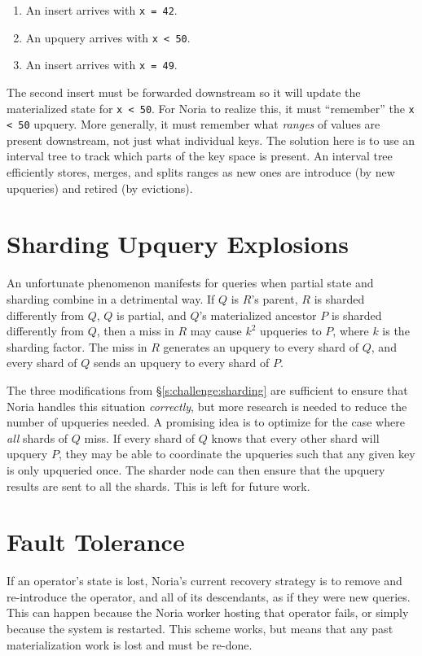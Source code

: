 \begin{enumerate}
  \item An insert arrives with \texttt{x = 42}.
  \item An upquery arrives with \texttt{x < 50}.
  \item An insert arrives with \texttt{x = 49}.
\end{enumerate}

The second insert must be forwarded downstream so it will update the
materialized state for \texttt{x < 50}. For Noria to realize this, it must
``remember'' the \texttt{x < 50} upquery. More generally, it must remember what
\emph{ranges} of values are present downstream, not just what individual keys.
The solution here is to use an interval tree to track which parts of the key
space is present. An interval tree efficiently stores, merges, and splits ranges
as new ones are introduce (by new upqueries) and retired (by evictions).

\section{Sharding Upquery Explosions}

An unfortunate phenomenon manifests for queries when partial state and sharding
combine in a detrimental way. If $Q$ is $R$'s parent, $R$ is sharded differently
from $Q$, $Q$ is partial, and $Q$'s materialized ancestor $P$ is sharded
differently from $Q$, then a miss in $R$ may cause $k^2$ upqueries to $P$, where
$k$ is the sharding factor. The miss in $R$ generates an upquery to every shard
of $Q$, and every shard of $Q$ sends an upquery to every shard of $P$.

The three modifications from \S\ref{s:challenge:sharding} are sufficient to
ensure that Noria handles this situation \emph{correctly}, but more research is
needed to reduce the number of upqueries needed. A promising idea is to optimize
for the case where \emph{all} shards of $Q$ miss. If every shard of $Q$ knows
that every other shard will upquery $P$, they may be able to coordinate the
upqueries such that any given key is only upqueried once. The sharder node can
then ensure that the upquery results are sent to all the shards. This is left
for future work.

\section{Fault Tolerance}

If an operator's state is lost, Noria's current recovery strategy is to remove
and re-introduce the operator, and all of its descendants, as if they were new
queries. This can happen because the Noria worker hosting that operator fails,
or simply because the system is restarted. This scheme works, but means that any
past materialization work is lost and must be re-done.

